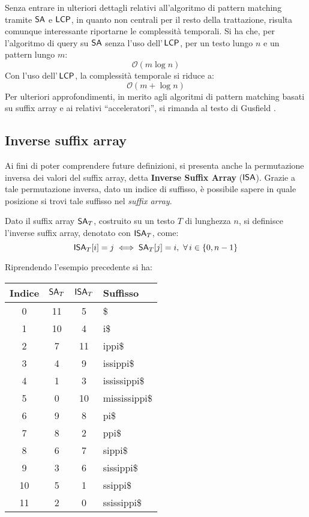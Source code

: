 Senza entrare in ulteriori dettagli relativi all'algoritmo di pattern matching
tramite $\mbox{\rm {\sf SA}}$ e $\mbox{\rm {\sf LCP}}$, in quanto non centrali per il resto della
trattazione, risulta comunque interessante riportarne le complessità
temporali. Si ha che, per l'algoritmo di query su $\mbox{\rm {\sf SA}}$ senza l'uso
dell'$\,\mbox{\rm {\sf LCP}}$, per un testo lungo $n$ e un pattern lungo $m$:
\begin{equation}
  \label{eq:satime}
  \mathcal{O}(m\log n)
\end{equation}
Con l'uso dell'$\,\mbox{\rm {\sf LCP}}$, la complessità temporale si riduce a:
\begin{equation}
  \label{eq:salcptime}
  \mathcal{O}(m+\log n)
\end{equation}
Per ulteriori approfondimenti, in merito agli algoritmi di pattern matching
basati su suffix array e ai relativi ``acceleratori'', si rimanda
al testo di Gusfield \cite{gusfield1997}.
\subsection{Inverse suffix array}
Ai fini di poter comprendere future definizioni, si presenta anche la
permutazione inversa dei valori del suffix array, detta
\textbf{Inverse Suffix Array} ($\mbox{\rm {\sf ISA}}$). Grazie a tale permutazione
inversa, dato un indice di suffisso, è possibile sapere in quale posizione si
trovi tale suffisso nel \textit{suffix array}.  
\begin{definizione}
  Dato il suffix array $\mbox{\rm {\sf SA}}_T$, costruito su un testo $T$ di lunghezza
  $n$, si definisce l'inverse suffix array, denotato con $\mbox{\rm {\sf ISA}}_T$, come:
  \begin{equation}
    \label{eq:isadef}
    \mbox{\rm {\sf ISA}}_T[i]=j\iff \mbox{\rm {\sf SA}}_T[j]=i,\,\,\forall\, i\in\{0,n-1\}
  \end{equation}
\end{definizione}

\begin{esempio}
  Riprendendo l'esempio precedente si ha:
  \begin{table}[H]
    \centering
    \footnotesize
    \begin{tabular}{c|c|c|l} 
      \textbf{Indice} & $\mbox{\rm {\sf SA}}_T$ & $\mbox{\rm {\sf ISA}}_T$ & \textbf{Suffisso}\\ 
      \hline
      0 & 11 & 5 & \$\\
      1 & 10 & 4 & i\$\\
      2 & 7 & 11 & ippi\$\\
      3 & 4 & 9 & issippi\$\\
      4 & 1 & 3 & ississippi\$\\
      5 & 0 & 10 & mississippi\$\\
      6 & 9 & 8 & pi\$\\
      7 & 8 & 2 & ppi\$\\
      8 & 6 & 7 & sippi\$\\
      9 & 3 & 6 & sissippi\$\\
      10 & 5 & 1 & ssippi\$\\
      11 & 2 & 0 & ssissippi\$\\
    \end{tabular}
  \end{table}
\end{esempio}
